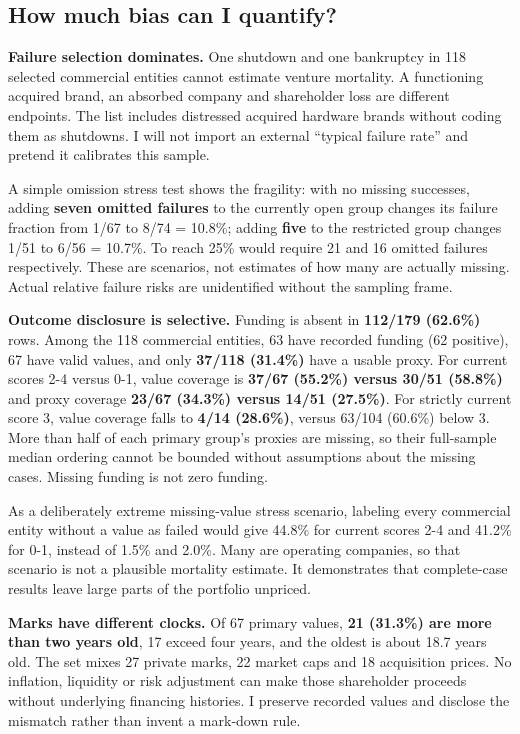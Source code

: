 \documentclass{article}
\begin{document}
\subsection{How much bias can I
quantify?}\label{how-much-bias-can-i-quantify}

\textbf{Failure selection dominates.} One shutdown and one bankruptcy in
118 selected commercial entities cannot estimate venture mortality. A
functioning acquired brand, an absorbed company and shareholder loss are
different endpoints. The list includes distressed acquired hardware
brands without coding them as shutdowns. I will not import an external
``typical failure rate'' and pretend it calibrates this sample.

A simple omission stress test shows the fragility: with no missing
successes, adding \textbf{seven omitted failures} to the currently open
group changes its failure fraction from 1/67 to 8/74 = 10.8\%; adding
\textbf{five} to the restricted group changes 1/51 to 6/56 = 10.7\%. To
reach 25\% would require 21 and 16 omitted failures respectively. These
are scenarios, not estimates of how many are actually missing. Actual
relative failure risks are unidentified without the sampling frame.

\textbf{Outcome disclosure is selective.} Funding is absent in
\textbf{112/179 (62.6\%)} rows. Among the 118 commercial entities, 63
have recorded funding (62 positive), 67 have valid values, and only
\textbf{37/118 (31.4\%)} have a usable proxy. For current scores 2-4
versus 0-1, value coverage is \textbf{37/67 (55.2\%) versus 30/51
(58.8\%)} and proxy coverage \textbf{23/67 (34.3\%) versus 14/51
(27.5\%)}. For strictly current score 3, value coverage falls to
\textbf{4/14 (28.6\%)}, versus 63/104 (60.6\%) below 3. More than half
of each primary group's proxies are missing, so their full-sample median
ordering cannot be bounded without assumptions about the missing cases.
Missing funding is not zero funding.

As a deliberately extreme missing-value stress scenario, labeling every
commercial entity without a value as failed would give 44.8\% for
current scores 2-4 and 41.2\% for 0-1, instead of 1.5\% and 2.0\%. Many
are operating companies, so that scenario is not a plausible mortality
estimate. It demonstrates that complete-case results leave large parts
of the portfolio unpriced.

\textbf{Marks have different clocks.} Of 67 primary values, \textbf{21
(31.3\%) are more than two years old}, 17 exceed four years, and the
oldest is about 18.7 years old. The set mixes 27 private marks, 22
market caps and 18 acquisition prices. No inflation, liquidity or risk
adjustment can make those shareholder proceeds without underlying
financing histories. I preserve recorded values and disclose the
mismatch rather than invent a mark-down rule.
\end{document}
